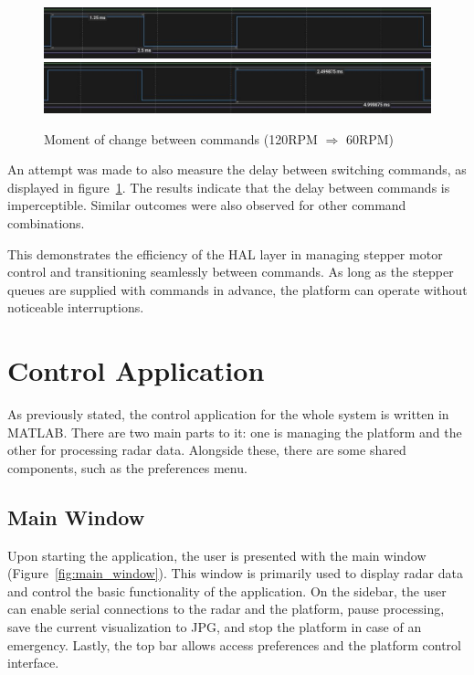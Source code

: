 \begin{figure}[h!]
  \centering
  \includegraphics[width=\textwidth]{../img/120rpm_to60_1.jpg}
  \includegraphics[width=\textwidth]{../img/120rpm_to60_2.jpg}
  \caption[Moment of change between commands with 120RPM and 60RPM]{Moment of change between commands (120RPM $\Rightarrow$  60RPM)}
  \label{fig:switching}
\end{figure}

An attempt was made to also measure the delay between switching commands, as displayed in figure~\ref{fig:switching}.
The results indicate that the delay between commands is imperceptible.
Similar outcomes were also observed for other command combinations.

This demonstrates the efficiency of the HAL layer in managing stepper motor control and transitioning seamlessly between commands.
As long as the stepper queues are supplied with commands in advance, the platform can operate without noticeable interruptions.

\chapter{Control Application}

As previously stated, the control application for the whole system is written in MATLAB.
There are two main parts to it: one is managing the platform and the other for processing radar data.
Alongside these, there are some shared components, such as the preferences menu.

\section{Main Window}

Upon starting the application, the user is presented with the main window (Figure~\ref{fig:main_window}).
This window is primarily used to display radar data and control the basic functionality of the application.
On the sidebar, the user can enable serial connections to the radar and the platform, pause processing, save the current visualization to JPG, and stop the platform in case of an emergency.
Lastly, the top bar allows access preferences and the platform control interface.

